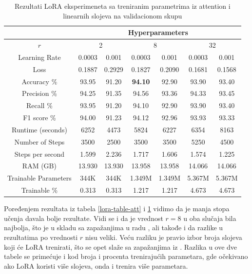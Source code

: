 \documentclass{article}
\theoremstyle{definition}
\begin{document}
	\begin{table}
		\centering
		\begin{tabular}{| c || c | c | c | c | c | c |} 
			\hline
			& \multicolumn{6}{c|}{Hyperparameters} \\
			\hline
			$r$ & \multicolumn{2}{c|}{2} & \multicolumn{2}{c|}{8} & 
			\multicolumn{2}{c|}{32} \\
			\hline
			Learning Rate & 0.0003 & 0.001 & 0.0003 & 0.001 & 0.0003 & 0.001 \\ [0.5ex]
			\hline\hline
			Loss & 0.1887 & 0.2929 & 0.1827 & 0.2090 & 0.1681 & 0.1568 \\
			Accuracy \% & 93.95 & 91.20 & \textbf{94.10} 
			\tablefootnote{Ovaj trening će se u tabeli test rezultata zvati 
			LoRA-att+lin}& 92.90 & 93.90 & 93.40 \\
			Precision \% & 94.25 & 91.35 & 94.56 & 93.36 & 94.33 & 93.45 \\
			Recall \% & 93.95 & 91.20 & 94.10 & 92.90 & 93.90 & 93.40 \\
			F1 score  \% & 94.00 & 91.23 & 94.12 & 92.96 & 93.93 & 93.33 \\
			\hline
			Runtime (seconds) & 6252 & 4473 & 5824 & 6227 & 6354 & 8163 \\
			Number of Steps & 3500 & 2500 & 3500 & 3500 & 5250 & 4500\\
			Steps per second & 1.599 & 2.236 & 1.717 & 1.606 & 1.574 & 1.225 \\
			RAM (GB) & 13.930 & 13.930 & 13.958 & 13.958 & 14.066 & 14.066 \\
			Trainable Parameters & 344K & 344K & 1.349M & 1.349M & 5.367M & 5.367M \\
			Trainable \% & 0.313 & 0.313 & 1.217 & 1.217 & 4.673 & 4.673 \\
			\hline
		\end{tabular}
		\caption{\label{lora-table-lin} Rezultati LoRA eksperimeneta sa treniranim 
		parametrima iz attention i linearnih slojeva na validacionom skupu}
	\end{table}

	Poređenjem rezultata iz tabela \ref{lora-table-att} i \ref{lora-table-lin} 
	vidimo da je manja stopa učenja davala bolje rezultate. Vidi se i da je 
	vrednost $r = 8$ u oba slučaja bila najbolja, što je u skladu sa zapažanjima 
	u radu \cite{lora}, ali takođe i da razlike u rezultatima po vrednosti $r$
	nisu veliki. Veću razliku je pravio izbor broja slojeva koji će LoRA trenirati,
	što se opet slaže sa zapažanjima iz \cite{qlora}. Razlika u ove dve tabele
	se primećuje i kod broja i procenta trenirajućih parametara, gde očekivano
	ako LoRA koristi više slojeva, onda i trenira više parametara.
\end{document}
